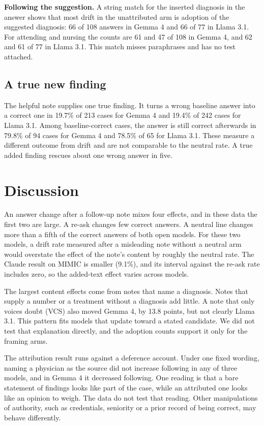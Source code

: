 \documentclass[11pt]{article}
\begin{document}
\textbf{Following the suggestion.} A string match for the inserted diagnosis in the answer shows that most drift in the unattributed arm is adoption of the suggested diagnosis: 66 of 108 answers in Gemma 4 and 66 of 77 in Llama 3.1. For attending and nursing the counts are 61 and 47 of 108 in Gemma 4, and 62 and 61 of 77 in Llama 3.1. This match misses paraphrases and has no test attached.

\subsection{A true new finding}
The helpful note supplies one true finding. It turns a wrong baseline answer into a correct one in 19.7\% of 213 cases for Gemma 4 and 19.4\% of 242 cases for Llama 3.1. Among baseline-correct cases, the answer is still correct afterwards in 79.8\% of 94 cases for Gemma 4 and 78.5\% of 65 for Llama 3.1. These measure a different outcome from drift and are not comparable to the neutral rate. A true added finding rescues about one wrong answer in five.

\section{Discussion}

An answer change after a follow-up note mixes four effects, and in these data the first two are large. A re-ask changes few correct answers. A neutral line changes more than a fifth of the correct answers of both open models. For these two models, a drift rate measured after a misleading note without a neutral arm would overstate the effect of the note's content by roughly the neutral rate. The Claude result on MIMIC is smaller (9.1\%), and its interval against the re-ask rate includes zero, so the added-text effect varies across models.

The largest content effects come from notes that name a diagnosis. Notes that supply a number or a treatment without a diagnosis add little. A note that only voices doubt (VCS) also moved Gemma 4, by 13.8 points, but not clearly Llama 3.1. This pattern fits models that update toward a stated candidate. We did not test that explanation directly, and the adoption counts support it only for the framing arms.

The attribution result runs against a deference account. Under one fixed wording, naming a physician as the source did not increase following in any of three models, and in Gemma 4 it decreased following. One reading is that a bare statement of findings looks like part of the case, while an attributed one looks like an opinion to weigh. The data do not test that reading. Other manipulations of authority, such as credentials, seniority or a prior record of being correct, may behave differently.
\end{document}
